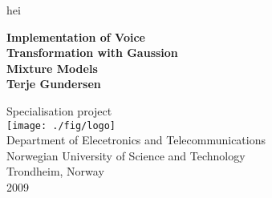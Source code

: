 \begin{titlepage}
 
\begin{center}
 
\color{white} hei\\[1cm]
\color{black}

{ \huge \textbf{Implementation of Voice\\[0.2cm] Transformation with Gaussion\\[0.5cm] Mixture Models}}\\[3cm]


 
{\LARGE \bf Terje Gundersen}
 
\vfill

\large Specialisation project \\[1.5cm]

\texttt{[image: ./fig/logo]}\\[0.5cm]
 



\large Department of Elecetronics and Telecommunications\\
Norwegian University of Science and Technology\\
Trondheim, Norway\\[0.5cm]


2009
 
\end{center}
 
\end{titlepage}
